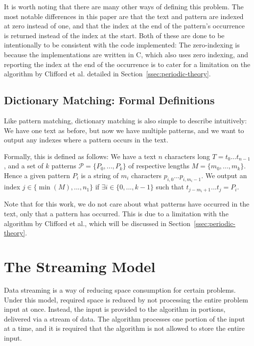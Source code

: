 \documentclass[ %
                    author={Dominic Joseph Moylett},
                    degree={MEng},
                     title={Dictionary Matching with Fingerprints},
                  subtitle={An Empirical Analysis},
                      type={research},
                      year={2015} ]{dissertation}
\begin{document}
It is worth noting that there are many other ways of defining this problem. The most notable differences in this paper are that the text and pattern are indexed at zero instead of one, and that the index at the end of the pattern's occurrence is returned instead of the index at the start. Both of these are done to be intentionally to be consistent with the code implemented: The zero-indexing is because the implementations are written in C, which also uses zero indexing, and reporting the index at the end of the occurrence is to cater for a limitation on the algorithm by Clifford et al. detailed in Section~\ref{ssec:periodic-theory}.

\subsection{Dictionary Matching: Formal Definitions}
\label{ssec:dict-matching:definitions}

Like pattern matching, dictionary matching is also simple to describe intuitively: We have one text as before, but now we have multiple patterns, and we want to output any indexes where a pattern occurs in the text.

Formally, this is defined as follows: We have a text $n$ characters long $T = t_0...t_{n-1}$, and a set of $k$ patterns $\mathcal{P} = \{P_0,...,P_k\}$ of respective lengths $M = \{m_0,...,m_k\}$. Hence a given pattern $P_i$ is a string of $m_i$ characters $p_{i,0}...p_{i,m_i-1}$. We output an index $j \in \{\min(M),...,n_1\}$ if $\exists i \in \{0,...,k-1\}$ such that $t_{j-m_i+1}...t_{j} = P_i$.

Note that for this work, we do not care about what patterns have occurred in the text, only that a pattern has occurred. This is due to a limitation with the algorithm by Clifford et al., which will be discussed in Section~\ref{ssec:periodic-theory}.

\section{The Streaming Model}

Data streaming is a way of reducing space consumption for certain problems. Under this model, required space is reduced by not processing the entire problem input at once. Instead, the input is provided to the algorithm in portions, delivered via a stream of data. The algorithm processes one portion of the input at a time, and it is required that the algorithm is not allowed to store the entire input.
\end{document}

